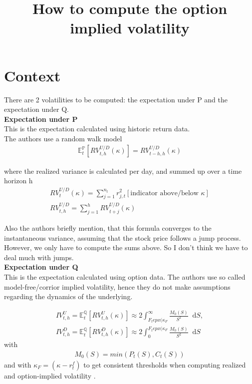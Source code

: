 \documentclass{article}
\title{How to compute the option implied volatility}
\newcommand*\diff{\mathop{}\!\mathrm{d}}
\begin{document}
\maketitle

\section{Context}\label{sec:1}

There are 2 volatilities to be computed: the expectation under P and the expectation under Q.\\

\textbf{Expectation under P}\\
This is the expectation calculated using historic return data.\\

The authors use a random walk model 
\begin{align}\label{eq:Ex_p}
\mathbb{E}_{t}^{\mathbb{P}} \left[ RV_{t,h}^{U/D} (\kappa) \right] = RV_{t-h,h}^{U/D}(\kappa)
\end{align}

where the realized variance is calculated per day, and summed up over a time horizon h
\begin{align}\label{eq:RV_p}
RV_{t}^{U/D}(\kappa) = \sum_{j=1}^{n_{t}} r_{j,t}^{2} [\text{indicator above/below $\kappa$}]\\
RV_{t,h}^{U/D} = \sum_{j=1}^{h} RV_{t+j}^{U/D}(\kappa)
\end{align}

Also the authors briefly mention, that this formula converges to the instantaneous variance, assuming that the stock price follows a jump process. However, we only have to compute the sums above. So I don't think we have to deal much with jumps.\\

\textbf{Expectation under Q}\\
This is the expectation calculated using option data. The authors use so called model-free/corrior implied volatility, hence they do not make assumptions regarding the dynamics of the underlying.

\begin{align}\label{eq:Ex_q}
IV_{t,h}^{U} = \mathbb{E}_{t}^{\mathbb{Q}} \left[ RV_{t,h}^{U} (\kappa) \right] \approx 2 \int_{F_{t}epx(\kappa_{F}}^{\infty} \frac{M_{0}(S)}{S^{2}} \diff S,\\
IV_{t,h}^{D} = \mathbb{E}_{t}^{\mathbb{Q}} \left[ RV_{t,h}^{D} (\kappa) \right] \approx 2 \int_{0}^{F_{t}epx(\kappa_{F}} \frac{M_{0}(S)}{S^{2}} \diff S
\end{align}
with
\begin{align*}
M_{0}(S) = min(P_{t}(S), C_{t}(S))
\end{align*}
and with $\kappa_{F} = (\kappa - r_{t}^{f})$ to get consistent thresholds when computing realized and option-implied volatility .\\
\end{document}

